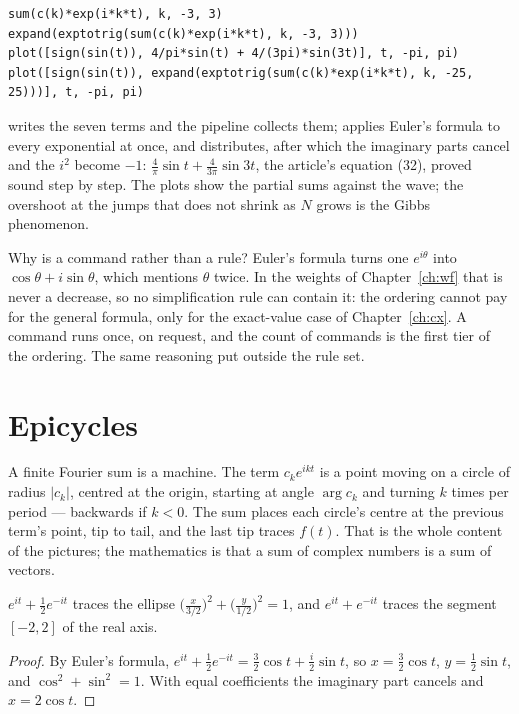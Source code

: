 \begin{trybox}
\begin{verbatim}
sum(c(k)*exp(i*k*t), k, -3, 3)
expand(exptotrig(sum(c(k)*exp(i*k*t), k, -3, 3)))
plot([sign(sin(t)), 4/pi*sin(t) + 4/(3pi)*sin(3t)], t, -pi, pi)
plot([sign(sin(t)), expand(exptotrig(sum(c(k)*exp(i*k*t), k, -25, 25)))], t, -pi, pi)
\end{verbatim}
   writes the seven terms and the pipeline collects them;  applies Euler's
  formula to every exponential at once, and  distributes, after which the imaginary
  parts cancel and the $i^2$ become $-1$: $\frac{4}{\pi}\sin t + \frac{4}{3\pi}\sin 3t$, the
  article's equation (32), proved sound step by step. The plots show the partial sums against the
  wave; the overshoot at the jumps that does not shrink as $N$ grows is the Gibbs phenomenon.
\end{trybox}

Why is  a command rather than a rule? Euler's formula turns one $e^{i\theta}$ into
$\cos\theta + i\sin\theta$, which mentions $\theta$ twice. In the weights of
Chapter~\ref{ch:wf} that is never a decrease, so no simplification rule can contain it: the
ordering cannot pay for the general formula, only for the exact-value case of
Chapter~\ref{ch:cx}. A command runs once, on request, and the count of commands is the first tier
of the ordering. The same reasoning put  outside the rule set.

\section{Epicycles}

A finite Fourier sum is a machine. The term $c_k e^{ikt}$ is a point moving on a circle of radius
$|c_k|$, centred at the origin, starting at angle $\arg c_k$ and turning $k$ times per period
--- backwards if $k < 0$. The sum places each circle's centre at the previous term's point, tip
to tail, and the last tip traces $f(t)$. That is the whole content of the pictures; the mathematics
is that a sum of complex numbers is a sum of vectors.

\begin{proposition}
  $e^{it} + \frac{1}{2}e^{-it}$ traces the ellipse $\big(\frac{x}{3/2}\big)^2 + \big(\frac{y}{1/2}\big)^2
  = 1$, and $e^{it} + e^{-it}$ traces the segment $[-2, 2]$ of the real axis.
\end{proposition}
\begin{proof}
  By Euler's formula, $e^{it} + \frac{1}{2}e^{-it} = \frac{3}{2}\cos t + \frac{i}{2}\sin t$, so
  $x = \frac{3}{2}\cos t$, $y = \frac{1}{2}\sin t$, and $\cos^2 + \sin^2 = 1$. With equal
  coefficients the imaginary part cancels and $x = 2\cos t$.
\end{proof}

